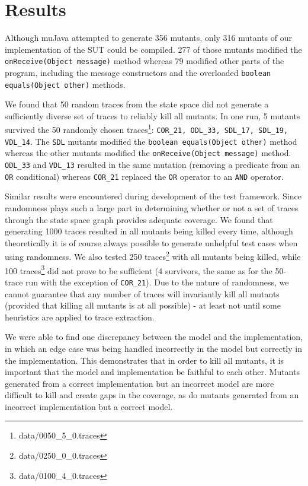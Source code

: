 \documentclass{article}
\begin{document}
	\section{Results}
		Although muJava attempted to generate 356 mutants, only 316 mutants of our implementation of the SUT could be compiled. 277 of those mutants modified the \texttt{onReceive(Object message)} method whereas 79 modified other parts of the program, including the message constructors and the overloaded \texttt{boolean equals(Object other)} methods.

		We found that 50 random traces from the state space did not generate a sufficiently diverse set of traces to reliably kill all mutants.
		In one run, 5 mutants survived the 50 randomly chosen traces\footnote{data/0050\_5\_0.traces}: \texttt{COR\_21, ODL\_33, SDL\_17, SDL\_19, VDL\_14}. The \texttt{SDL} mutants modified the \texttt{boolean equals(Object other)} method whereas the other mutants modified the \texttt{onReceive(Object message)} method. \texttt{ODL\_33} and \texttt{VDL\_13} resulted in the same mutation (removing a predicate from an \texttt{OR} conditional) whereas \texttt{COR\_21} replaced the \texttt{OR} operator to an \texttt{AND} operator.

		Similar results were encountered during development of the test framework. Since randomness plays such a large part in determining whether or not a set of traces through the state space graph provides adequate coverage. We found that generating 1000 traces resulted in all mutants being killed every time, although theoretically it is of course always possible to generate unhelpful test cases when using randomness. We also tested 250 traces\footnote{data/0250\_0\_0.traces} with all mutants being killed, while 100 traces\footnote{data/0100\_4\_0.traces} did not prove to be sufficient (4 survivors, the same as for the 50-trace run with the exception of \texttt{COR\_21}). Due to the nature of randomness, we cannot guarantee that any number of traces will invariantly kill all mutants (provided that killing all mutants is at all possible) \-- at least not until some heuristics are applied to trace extraction.

		We were able to find one discrepancy between the model and the implementation, in which an edge case was being handled incorrectly in the model but correctly in the implementation. This demonstrates that in order to kill all mutants, it is important that the model and implementation be faithful to each other. Mutants generated from a correct implementation but an incorrect model are more difficult to kill and create gaps in the coverage, as do mutants generated from an incorrect implementation but a correct model.
\end{document}
